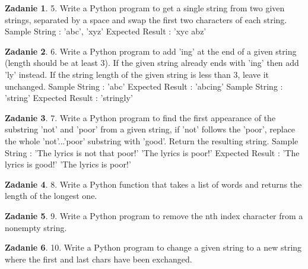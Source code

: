 \documentclass[11pt]{article}
\theoremstyle{definition}
\newtheorem{zadanie}{Zadanie}
\begin{document}
\begin{zadanie}


5. Write a Python program to get a single string from two given strings, separated by a space and swap the first two characters of each string. 
Sample String : 'abc', 'xyz'
Expected Result : 'xyc abz'

\end{zadanie}

\begin{zadanie}


6. Write a Python program to add 'ing' at the end of a given string (length should be at least 3). If the given string already ends with 'ing' then add 'ly' instead. If the string length of the given string is less than 3, leave it unchanged. 
Sample String : 'abc'
Expected Result : 'abcing'
Sample String : 'string'
Expected Result : 'stringly'

\end{zadanie}

\begin{zadanie}


7. Write a Python program to find the first appearance of the substring 'not' and 'poor' from a given string, if 'not' follows the 'poor', replace the whole 'not'...'poor' substring with 'good'. Return the resulting string. 
Sample String : 'The lyrics is not that poor!'
'The lyrics is poor!'
Expected Result : 'The lyrics is good!'
'The lyrics is poor!'

\end{zadanie}

\begin{zadanie}


8. Write a Python function that takes a list of words and returns the length of the longest one. 

\end{zadanie}

\begin{zadanie}


9. Write a Python program to remove the nth index character from a nonempty string. 

\end{zadanie}

\begin{zadanie}


10. Write a Python program to change a given string to a new string where the first and last chars have been exchanged. 

\end{zadanie}
\end{document}
